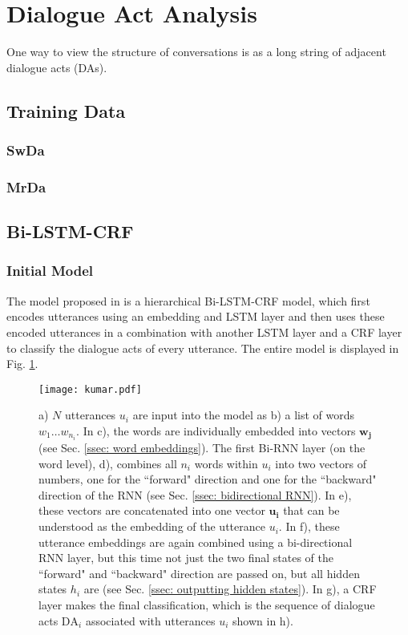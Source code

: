 \section{Dialogue Act Analysis}
    
    One way to view the structure of conversations is as a long string of adjacent dialogue acts (DAs).
    \subsection{Training Data}
        \subsubsection{SwDa}
        \subsubsection{MrDa}
    \subsection{Bi-LSTM-CRF \label{ssec: bi-lstm-crf}}
        \subsubsection{Initial Model}
        The model proposed in \cite{kumar2017dialogue} is a hierarchical Bi-LSTM-CRF model, which first encodes utterances using an embedding and LSTM layer and then uses these encoded utterances in a combination with another LSTM layer and a CRF layer to classify the dialogue acts of every utterance. The entire model is displayed in Fig. \ref{fig:kumar_model}.
        
        \begin{figure}[h]
            \centering
            \texttt{[image: kumar.pdf]}
            \caption{a) $N$ utterances $u_i$ are input into the model as b) a list of words $w_1 \dots w_{n_i}$. In c), the words are individually embedded into vectors $\mathbf{w_j}$ (see Sec. \ref{ssec: word embeddings}). The first Bi-RNN layer (on the word level), d), combines all $n_i$ words within $u_i$ into two vectors of numbers, one for the ``forward" direction and one for the ``backward" direction of the RNN (see Sec. \ref{ssec: bidirectional RNN}). In e), these vectors are concatenated into one vector $\mathbf{u_i}$ that can be understood as the embedding of the utterance $u_i$. In f), these utterance embeddings are again combined using a bi-directional RNN layer, but this time not just the two final states of the ``forward" and ``backward" direction are passed on, but all hidden states $h_i$ are (see Sec. \ref{ssec: outputting hidden states}). In g), a CRF layer makes the final classification, which is the sequence of dialogue acts $\text{DA}_i$ associated with utterances $u_i$ shown in h).}
            \label{fig:kumar_model}
        \end{figure}
        
